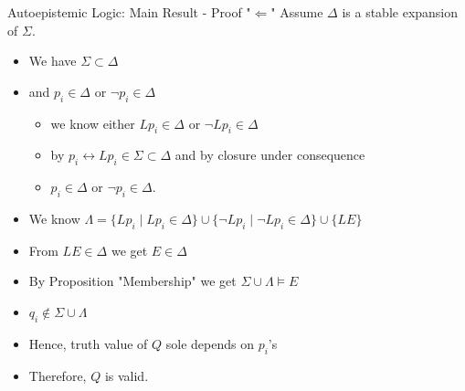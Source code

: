 \documentclass[usenames,dvipsnames, 8pt]{beamer}
\let\liff\leftrightarrow
\let\lneg\neg
\begin{document}
\begin{frame}{Autoepistemic Logic: Main Result - Proof "$\Longleftarrow$"}
Assume $\Delta$ is a stable expansion of $\Sigma$.
\begin{itemize}[label = {$\bullet$}]
\item We have $\Sigma \subset \Delta$
\item and $p_i \in \Delta$ or $\lneg p_i \in \Delta$
\begin{itemize}[label={$-$}]
\item we know either $Lp_i \in \Delta$ or $\lneg Lp_i \in \Delta$
\item by $p_i \liff Lp_i \in \Sigma \subset \Delta$ and by closure under consequence
\item $p_i \in \Delta$ or $\lneg p_i \in \Delta$.
\end{itemize}
\item We know $\Lambda=\{Lp_i \mid Lp_i \in \Delta\} \cup \{\neg Lp_i \mid \neg Lp_i \in \Delta\} \cup \{LE\}$ 
\item From $LE\in\Delta$ we get $E\in\Delta$
\item By Proposition "Membership" we get $\Sigma \cup \Lambda \models E$
\item $q_i \nin \Sigma \cup \Lambda$ 
\item Hence, truth value of $Q$ sole depends on $p_i$'s 
\item Therefore, $Q$ is valid.
\end{itemize}
\end{frame}
\end{document}
